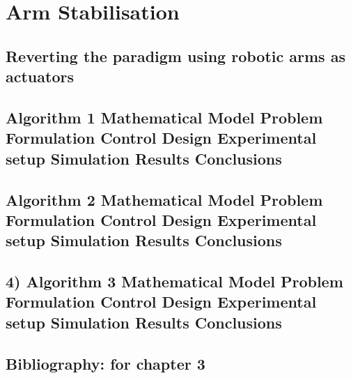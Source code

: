 \chapter{Arm Stabilisation}

\section{Reverting the paradigm using robotic arms as actuators}
\section{Algorithm 1
	Mathematical Model
	Problem Formulation
	Control Design
	Experimental setup
	Simulation Results
	Conclusions}
\section{Algorithm 2
	Mathematical Model
	Problem Formulation
	Control Design
	Experimental setup
	Simulation Results
	Conclusions}
\section{ 
	4) Algorithm 3
	Mathematical Model
	Problem Formulation
	Control Design
	Experimental setup
	Simulation Results
	Conclusions}
\section{Bibliography: for chapter 3}